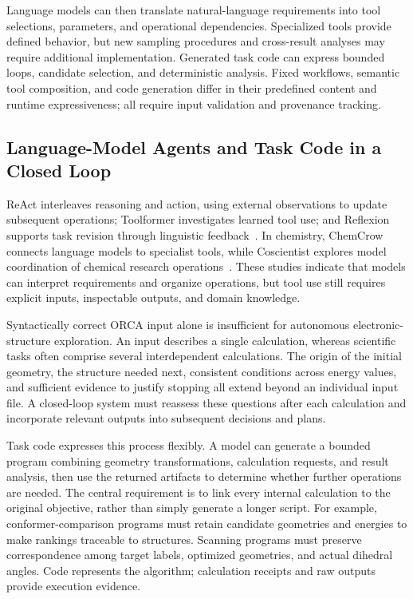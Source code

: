 \documentclass[a4paper,11pt]{article}
\begin{document}
Language models can then translate natural-language requirements into tool selections, parameters, and operational dependencies.
Specialized tools provide defined behavior, but new sampling procedures and cross-result analyses may require additional implementation.
Generated task code can express bounded loops, candidate selection, and deterministic analysis.
Fixed workflows, semantic tool composition, and code generation differ in their predefined content and runtime expressiveness; all require input validation and provenance tracking.

\subsection{Language-Model Agents and Task Code in a Closed Loop}
ReAct interleaves reasoning and action, using external observations to update subsequent operations; Toolformer investigates learned tool use; and Reflexion supports task revision through linguistic feedback~\cite{react,toolformer,reflexion}.
In chemistry, ChemCrow connects language models to specialist tools, while Coscientist explores model coordination of chemical research operations~\cite{chemcrow,coscientist}.
These studies indicate that models can interpret requirements and organize operations, but tool use still requires explicit inputs, inspectable outputs, and domain knowledge.

Syntactically correct ORCA input alone is insufficient for autonomous electronic-structure exploration.
An input describes a single calculation, whereas scientific tasks often comprise several interdependent calculations.
The origin of the initial geometry, the structure needed next, consistent conditions across energy values, and sufficient evidence to justify stopping all extend beyond an individual input file.
A closed-loop system must reassess these questions after each calculation and incorporate relevant outputs into subsequent decisions and plans.

Task code expresses this process flexibly.
A model can generate a bounded program combining geometry transformations, calculation requests, and result analysis, then use the returned artifacts to determine whether further operations are needed.
The central requirement is to link every internal calculation to the original objective, rather than simply generate a longer script.
For example, conformer-comparison programs must retain candidate geometries and energies to make rankings traceable to structures.
Scanning programs must preserve correspondence among target labels, optimized geometries, and actual dihedral angles.
Code represents the algorithm; calculation receipts and raw outputs provide execution evidence.
\end{document}
